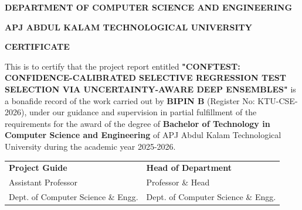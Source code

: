 \clearpage
\begin{center}
    {\large \textbf{DEPARTMENT OF COMPUTER SCIENCE AND ENGINEERING}\par}
    {\large \textbf{APJ ABDUL KALAM TECHNOLOGICAL UNIVERSITY}\par}
    \vspace{1.0cm}
    {\Large \textbf{CERTIFICATE}\par}
\end{center}
\vspace{1.0cm}

This is to certify that the project report entitled \textbf{"CONFTEST: CONFIDENCE-CALIBRATED SELECTIVE REGRESSION TEST SELECTION VIA UNCERTAINTY-AWARE DEEP ENSEMBLES"} is a bonafide record of the work carried out by \textbf{BIPIN B} (Register No: KTU-CSE-2026), under our guidance and supervision in partial fulfillment of the requirements for the award of the degree of \textbf{Bachelor of Technology in Computer Science and Engineering} of APJ Abdul Kalam Technological University during the academic year 2025-2026.

\vspace{3.0cm}
\noindent
\begin{tabular}{@{}p{7cm}p{7cm}@{}}
    \textbf{Project Guide} & \textbf{Head of Department} \\
    Assistant Professor & Professor \& Head \\
    Dept. of Computer Science \& Engg. & Dept. of Computer Science \& Engg. \\
\end{tabular}

\clearpage
